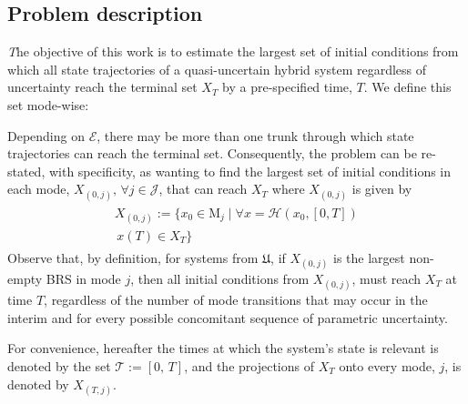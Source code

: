 \subsection{Problem description}
{\emph The objective of this work is to estimate the largest set of initial conditions from which all state trajectories of a quasi-uncertain hybrid system regardless of uncertainty reach the terminal set $X_T$ by a pre-specified time, $T$.}
We define this set mode-wise:
\par
Depending on $\mathcal E$, there may be more than one trunk through which state trajectories can reach the terminal set. Consequently, the problem can be re-stated, with specificity, as wanting to find the largest set of initial conditions in each mode, $X_{(0,j)},\,\forall j\in \mathcal J$, that can reach $X_T$ where $X_{(0,j)}$ is given by
\begin{align}
\begin{aligned}
     X_{(0,j)}:=\{x_0\in \mathrm M_j\mid \forall x=\mathcal H(x_0,[0,T]) \\\,x(T)\in X_T\}
     \label{eq:brs}
\end{aligned}
\end{align}
Observe that, by definition, for systems from $\mathfrak{U}$, if $X_{(0,j)}$ is the largest non-empty BRS in mode $j$, then all initial conditions from $X_{(0,j)}$, must reach $X_T$ at time $T$, regardless of the number of mode transitions that may occur in the interim and for every possible concomitant sequence of parametric uncertainty.
\par
For convenience, hereafter the times at which the system's state is relevant is denoted by the set $\mathcal T:=[0,\,T]$, and the projections of $X_T$ onto every mode, $j$, is denoted by $X_{(T,j)}$.
